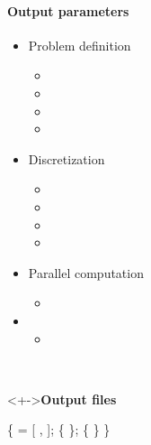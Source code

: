 
\begin{frame}[fragile] 
\secframetitle{\ssParameters}
\framesubtitle{Output parameters}
\vspace{-0.2in}
\begin{minipage}[t]{1.7in}
\begin{itemize}
\item Problem definition
  \begin{itemize}
  \item {}
  \item {}
  \item {}
  \item {}
  \end{itemize}
\item Discretization
  \begin{itemize}
  \item {}
  \item {}
  \item {}
  \item {}
  \end{itemize}
\item Parallel computation
  \begin{itemize}
  \item {}
  \end{itemize}
\item {}
  \begin{itemize}
    \item {}
  \end{itemize}
\end{itemize}
\end{minipage} \
\begin{minipage}[t]{2.6in}
\vspace{-0.2in}
 \begin{block}<+->{\textbf{Output files}}
 \footnotesize \vspace{-0.1in}
\begin{semiverbatim}
 \{
    = [ ,  ];
   \subgroup{de_hdf5} \{
   \};
    \{
   \}
\}
\end{semiverbatim}
 \end{block}
 \end{minipage}
\end{frame}
 
